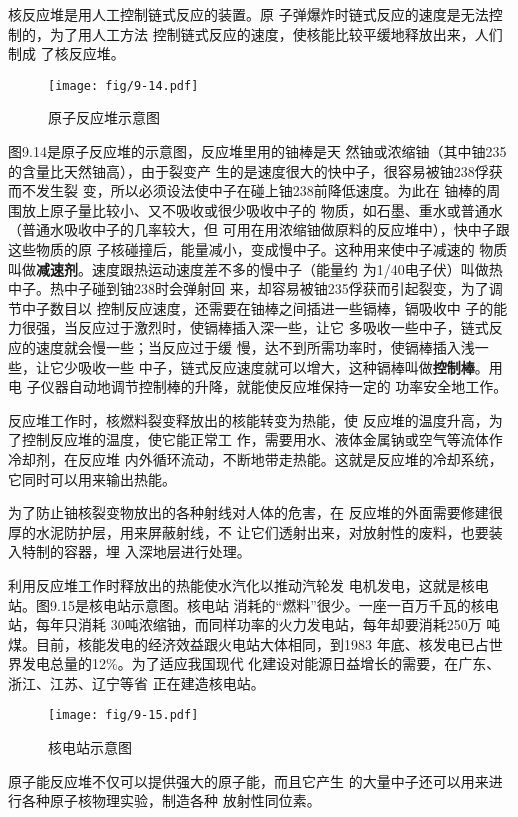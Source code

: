 核反应堆是用人工控制链式反应的装置。原
子弹爆炸时链式反应的速度是无法控制的，为了用人工方法
控制链式反应的速度，使核能比较平缓地释放出来，人们制成
了核反应堆。
\begin{figure}[htp]
    \centering
    \texttt{[image: fig/9-14.pdf]}
    \caption{原子反应堆示意图}
\end{figure}

图9.14是原子反应堆的示意图，反应堆里用的铀棒是天
然铀或浓缩铀（其中铀235的含量比天然铀高），由于裂变产
生的是速度很大的快中子，很容易被铀238俘获而不发生裂
变，所以必须设法使中子在碰上铀238前降低速度。为此在
铀棒的周围放上原子量比较小、又不吸收或很少吸收中子的
物质，如石墨、重水或普通水（普通水吸收中子的几率较大，但
可用在用浓缩铀做原料的反应堆中），快中子跟这些物质的原
子核碰撞后，能量减小，变成慢中子。这种用来使中子减速的
物质叫做\textbf{减速剂}。速度跟热运动速度差不多的慢中子（能量约
为1/40电子伏）叫做热中子。热中子碰到铀238时会弹射回
来，却容易被铀235俘获而引起裂变，为了调节中子数目以
控制反应速度，还需要在铀棒之间插进一些镉棒，镉吸收中
子的能力很强，当反应过于激烈时，使镉棒插入深一些，让它
多吸收一些中子，链式反应的速度就会慢一些；当反应过于缓
慢，达不到所需功率时，使镉棒插入浅一些，让它少吸收一些
中子，链式反应速度就可以增大，这种镉棒叫做\textbf{控制棒}。用电
子仪器自动地调节控制棒的升降，就能使反应堆保持一定的
功率安全地工作。

反应堆工作时，核燃料裂变释放出的核能转变为热能，使
反应堆的温度升高，为了控制反应堆的温度，使它能正常工
作，需要用水、液体金属钠或空气等流体作冷却剂，在反应堆
内外循环流动，不断地带走热能。这就是反应堆的冷却系统，
它同时可以用来输出热能。

为了防止铀核裂变物放出的各种射线对人体的危害，在
反应堆的外面需要修建很厚的水泥防护层，用来屏蔽射线，不
让它们透射出来，对放射性的废料，也要装入特制的容器，埋
入深地层进行处理。

利用反应堆工作时释放出的热能使水汽化以推动汽轮发
电机发电，这就是核电站。图9.15是核电站示意图。核电站
消耗的“燃料”很少。一座一百万千瓦的核电站，每年只消耗
30吨浓缩铀，而同样功率的火力发电站，每年却要消耗250万
吨煤。目前，核能发电的经济效益跟火电站大体相同，到1983
年底、核发电已占世界发电总量的12\%。为了适应我国现代
化建设对能源日益增长的需要，在广东、浙江、江苏、辽宁等省
正在建造核电站。

\begin{figure}[htp]
    \centering
    \texttt{[image: fig/9-15.pdf]}
    \caption{核电站示意图}
\end{figure}

原子能反应堆不仅可以提供强大的原子能，而且它产生
的大量中子还可以用来进行各种原子核物理实验，制造各种
放射性同位素。

